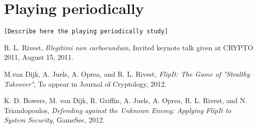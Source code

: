\section{Playing periodically}
\texttt{[Describe here the playing periodically study]}


\begin{thebibliography}{9}

  R. L. Rivest,
  \emph{Illegitimi non carborundum},
  Invited keynote talk given at CRYPTO 2011,
  August 15, 2011.

  M.van Dijk, A. Juels, A. Oprea, and R. L. Rivest,
  \emph{FlipIt: The Game of "Stealthy Takeover"},
  To appear in Journal of Cryptology,
  2012.

  K. D. Bowers, M. van Dijk, R. Griffin, A. Juels, A. Oprea, R. L. Rivest, and N. Triandopoulos,
  \emph{Defending against the Unknown Enemy: Applying FlipIt to System Security},
  GameSec,
  2012.

\end{thebibliography}


